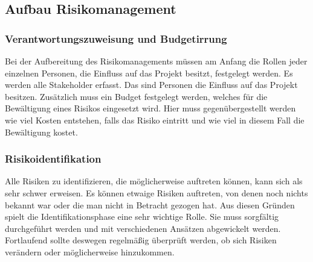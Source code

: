 \subsection{Aufbau Risikomanagement}
\subsubsection{Verantwortungszuweisung und Budgetirrung}
Bei der Aufbereitung des Risikomanagements müssen am Anfang die Rollen jeder einzelnen Personen, die Einfluss auf das Projekt besitzt, festgelegt werden. Es werden alle Stakeholder erfasst. Das sind Personen die Einfluss auf das Projekt besitzen.
Zusätzlich muss ein Budget festgelegt werden, welches für die Bewältigung eines Risikos eingesetzt wird. Hier muss gegenübergestellt werden wie viel Kosten entstehen, falls das Risiko eintritt und wie viel in diesem Fall die Bewältigung kostet.

\subsubsection{Risikoidentifikation}
Alle Risiken zu identifizieren, die möglicherweise auftreten können, kann sich als sehr schwer erweisen. Es können etwaige Risiken auftreten, von denen noch nichts bekannt war oder die man nicht in Betracht gezogen hat. Aus diesen Gründen spielt die Identifikationsphase eine sehr wichtige Rolle. Sie muss sorgfältig durchgeführt werden und mit verschiedenen Ansätzen abgewickelt werden. Fortlaufend sollte deswegen regelmäßig überprüft werden, ob sich Risiken verändern oder möglicherweise hinzukommen.
\\

